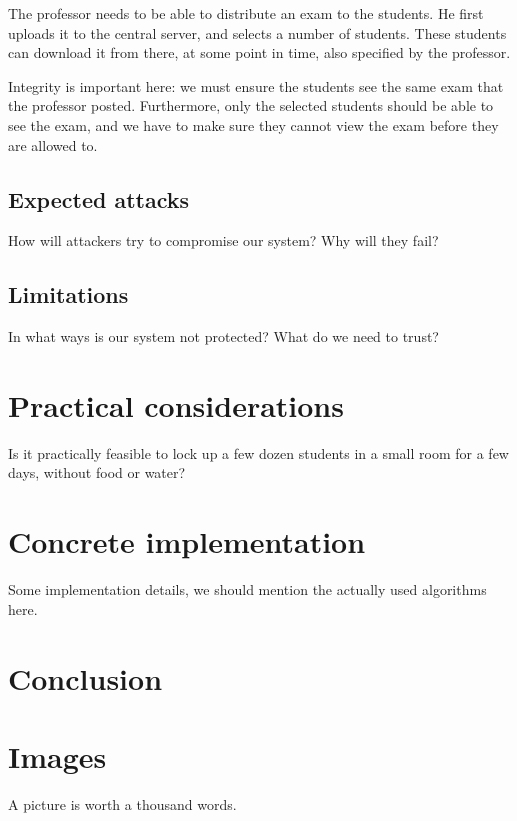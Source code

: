 \documentclass{article}
\begin{document}
The professor needs to be able to distribute an exam to the students. He first
uploads it to the central server, and selects a number of students. These
students can download it from there, at some point in time, also specified by
the professor.

Integrity is important here: we must ensure the students see the same exam that
the professor posted. Furthermore, only the selected students should be able to
see the exam, and we have to make sure they cannot view the exam before they are
allowed to.

\subsection{Expected attacks}

How will attackers try to compromise our system? Why will they fail?

\subsection{Limitations}

In what ways is our system not protected? What do we need to trust?

\section{Practical considerations}

Is it practically feasible to lock up a few dozen students in a small room for a
few days, without food or water?

\section{Concrete implementation}

Some implementation details, we should mention the actually used algorithms
here.

\section{Conclusion}

\section{Images}

A picture is worth a thousand words.
\end{document}
